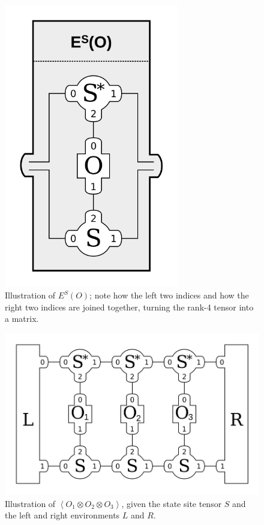 \documentclass{article}
\begin{document}
\begin{figure}
\centering
\includegraphics[width=3in]{drawings/E-O-matrix-car}
\caption{\label{fig:E-O-matrix} Illustration of $E^S(O)$; note how the left two indices and how the right two indices are joined together, turning the rank-4 tensor into a matrix.}
\end{figure}

\begin{figure}
\centering
\includegraphics[width=\textwidth]{drawings/E-Os-matrix-car}
\caption{\label{fig:E-Os-matrix} Illustration of $\left<O_1\otimes O_2\otimes O_3\right>$, given the state site tensor $S$ and the left and right environments $L$ and $R$.}
\end{figure}
\end{document}
